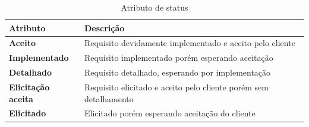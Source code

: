 \begin{table}[H]
\begin{tabular}{|p{4cm}|p{11cm}|}

\hline
\textbf{Atributo} &
\textbf{Descrição}
\\ \hline

\textbf{Aceito} &
Requisito devidamente implementado e aceito pelo cliente
\\ \hline

\textbf{Implementado} &
Requisito implementado porém esperando aceitação
\\ \hline

\textbf{Detalhado} &
Requisito detalhado, esperando por implementação
\\ \hline

\textbf{Elicitação aceita} &
Requisito elicitado e aceito pelo cliente porém sem detalhamento
\\ \hline

\textbf{Elicitado} &
Elicitado porém esperando aceitação do cliente
\\ \hline

\end{tabular}
\caption{Atributo de status}
\label{tab:atributo_status}
\end{table}
